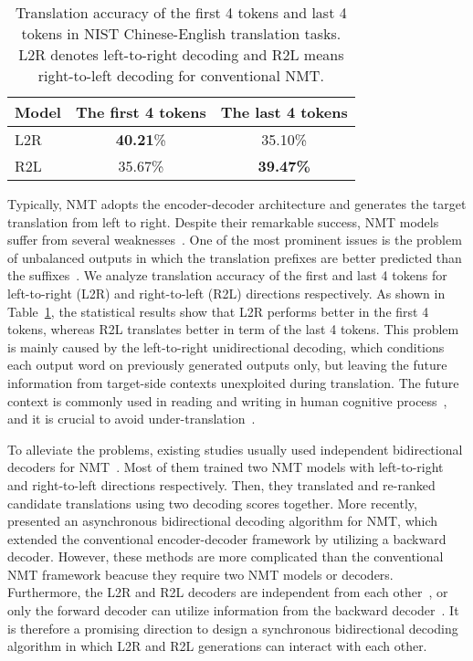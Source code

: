 \documentclass[11pt,a4paper]{article}
\begin{document}
\begin{CJK*}{UTF8}{gbsn}
\begin{table}\centering
\begin{tabular}{|l||c|c|}
  \hline
   Model              &    The first 4 tokens &  The last 4 tokens               \\
  \hline
  \hline
   L2R               &      \textbf{40.21}\%       &   35.10\%       \\
   R2L                &      35.67\%       &   \textbf{39.47\%}      \\
\hline
\end{tabular}
\caption{Translation accuracy of the first 4 tokens and last 4 tokens in NIST Chinese-English translation tasks.
  L2R denotes left-to-right decoding and R2L means right-to-left decoding for conventional NMT.
  } \label{trans-acc}
\end{table}


Typically, NMT adopts the encoder-decoder architecture and generates the target translation from left to right. Despite their remarkable success, NMT models suffer from several weaknesses~\cite{koehn2017six}.
One of the most prominent issues is the problem of unbalanced outputs in which the translation prefixes are better predicted than the suffixes~\cite{liu2016agreementa}.
We analyze translation accuracy of the first and last 4 tokens for left-to-right (L2R) and right-to-left (R2L) directions respectively.
As shown in Table~\ref{trans-acc}, the statistical results show that L2R performs better in the first 4 tokens, whereas R2L translates better in term of the last 4 tokens.
This problem is mainly caused by the left-to-right unidirectional decoding, which conditions each output word on previously generated outputs only, but leaving the future information from target-side contexts unexploited during translation.
The future context is commonly used in reading and writing in human cognitive process~\cite{NIPS2017_6775}, and it is crucial to avoid under-translation~\cite{Tu:2016,D16-1096}.

To alleviate the problems, existing studies usually used independent bidirectional decoders for NMT~\cite{liu2016agreementa,W16-2323}.
Most of them trained two NMT models with left-to-right and right-to-left directions respectively. Then, they translated and re-ranked candidate translations using two decoding scores together.
More recently,  presented an asynchronous bidirectional decoding algorithm for NMT, which extended the conventional encoder-decoder framework by utilizing a backward decoder.
However, these methods are more complicated than the conventional NMT framework beacuse they require two NMT models or decoders.
Furthermore, the L2R and R2L decoders are independent from each other~\cite{liu2016agreementa}, or only the forward decoder can utilize information from the backward decoder~\cite{zhang2018asynchronous}.
It is therefore a promising direction to design a synchronous bidirectional decoding algorithm in which L2R and R2L generations can interact with each other.


\end{CJK*}
\end{document}
